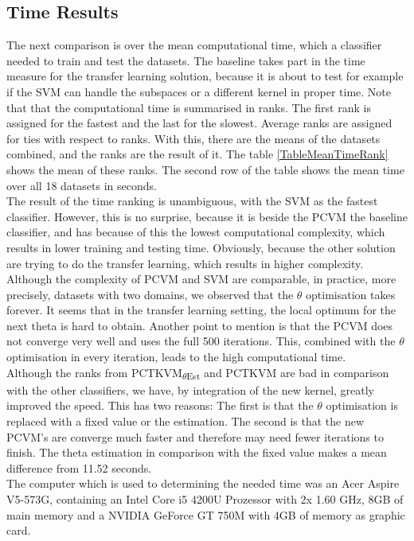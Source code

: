 \subsection{Time Results}\label{EmSubSecTimeResults}
The next comparison is over the mean computational time, which a classifier needed to train and test the datasets.
The baseline takes part in the time measure for the transfer learning solution, because it is about to test for example if the \acs{SVM} can handle the subspaces or a different kernel in proper time.
Note that that the computational time is summarised in ranks.
The first rank is assigned for the fastest and the last for the slowest.
Average ranks are assigned for ties with respect to ranks.
With this, there are the means of the datasets combined, and the ranks are the result of it.
The table \ref{TableMeanTimeRank} shows the mean of these ranks.
The second row of the table shows the mean time over all 18 datasets in seconds.\\
The result of the time ranking is unambiguous, with the \acs{SVM} as the fastest classifier. 
However, this is no surprise, because it is beside the \acs{PCVM} the baseline classifier, and has because of this the lowest computational complexity, which results in lower training and testing time.
Obviously, because the other solution are trying to do the transfer learning, which results in higher complexity.\\
Although the complexity of \acs{PCVM} and \acs{SVM} are comparable, in practice, more precisely, datasets with two domains, we observed that the $\theta$ optimisation takes forever.
It seems that in the transfer learning setting, the local optimum for the next theta is hard to obtain.
Another point to mention is that the \acs{PCVM} does not converge very well and uses the full 500 iterations. 
This, combined with the $\theta$ optimisation in every iteration, leads to the high computational time.\\
Although the ranks from \acs{PCTKVM}\textsubscript{$\theta$Est} and \acs{PCTKVM} are bad in comparison with the other classifiers, we have, by integration of the new kernel, greatly improved the speed.
This has two reasons: 
The first is that the $\theta$ optimisation is replaced with a fixed value or the estimation.
The second is that the new \acs{PCVM}'s are converge much faster and therefore may need fewer iterations to finish.
The theta estimation in comparison with the fixed value makes a mean difference from 11.52 seconds.\\
The computer which is used to determining the needed time was an Acer Aspire V5-573G, containing an Intel Core i5 4200U Prozessor with 2x 1.60 GHz, 8GB of main memory and a NVIDIA GeForce GT 750M with 4GB of memory as graphic card.
